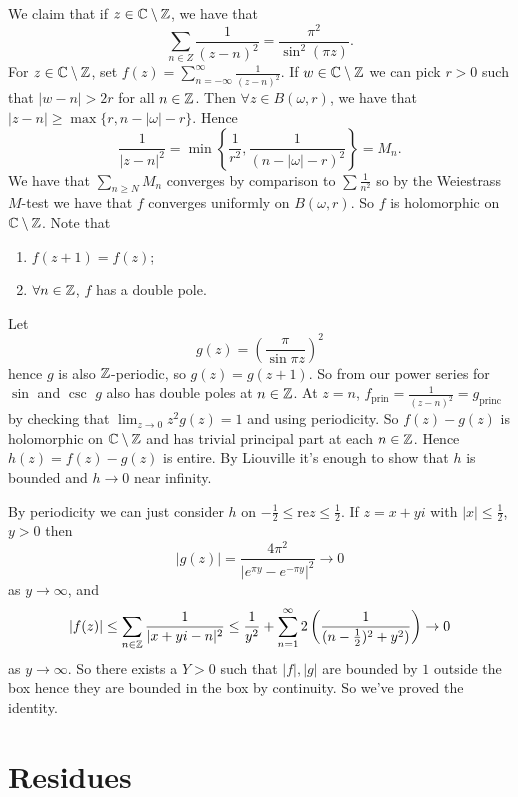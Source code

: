 \documentclass{article}
\begin{document}
\begin{example}
  We claim that if $ z\in \mathbb{C}\setminus \mathbb{Z} $, we have that
  \[
	  \sum_{n\in Z} \frac 1{(z-n)^2} = \frac {\pi^2}{\sin^2(\pi z)}.
  \]
  For $ z\in \mathbb{C}\setminus \mathbb{Z} $, set $ f(z) = \sum_{n=-\infty}^\infty \frac 1{(z-n)^2} $. If $ w\in \mathbb{C}\setminus \mathbb{Z} $ we can pick $ r>0 $ such that $ |w-n| > 2r $ for all $ n\in \mathbb{Z} $. Then $ \forall z\in B(\omega,r) $, we have that $ |z-n| \ge \max\{r,n-|\omega| -r \} $. Hence
  \[
	  \frac 1{|z-n|^2} = \min\left\{ \frac 1{r^2}, \frac1{(n-|\omega|-r)^2}\right\} = M_n.
  \]
  We have that $ \sum_{n\ge N} M_n $ converges by comparison to $ \sum \frac 1{n^2} $ so by the Weiestrass $ M $-test we have that $ f $ converges uniformly on $ B(\omega,r) $. So $ f $ is holomorphic on $ \mathbb{C}\setminus \mathbb{Z} $. Note that 
  \begin{enumerate}
	  \item $ f(z+1) = f(z) $;
	  \item $ \forall n\in \mathbb{Z} $, $ f $ has a double pole.
  \end{enumerate}
  Let
  \[
	  g(z) = \left(\frac \pi{\sin\pi z}\right)^2
  \]
  hence $ g $ is also $ \mathbb{Z} $-periodic, so $ g(z) = g(z+1) $. So from our power series for $ \sin $ and $ \csc $ $ g $ also has double poles at $ n\in \mathbb{Z} $. At $ z=n $, $ f_{\text{prin}} = \frac 1{(z-n)^2}=g_{\text{princ}} $ by checking that $ \lim_{z\to 0} z^2g(z) = 1 $ and using periodicity. So $ f(z)-g(z) $ is holomorphic on $ \mathbb{C}\setminus \mathbb{Z} $ and has trivial principal part at each $ n\in \mathbb{Z} $. Hence $ h(z) = f(z)-g(z) $ is entire. By Liouville it's enough to show that $ h $ is bounded and $ h\to 0 $ near infinity.\par
  By periodicity we can just consider $ h $ on $ -\frac 12 \le \mathrm{re} z \le \frac 12 $. If $ z=x+yi $ with $ |x| \le \frac 12 $, $ y>0 $ then
  \[
	  |g(z)| = \frac{4\pi^2}{|e^{\pi y}-e^{-\pi y}|^2} \to 0
  \]
  as $ y\to\infty $, and
  \[
	  |f(z)| \le \sum_{n\in \mathbb{Z}} \frac 1{|x+yi-n|^2} \le \frac 1{y^2} + \sum_{n=1}^\infty 2\left(\frac 1{(n-\frac 12)^2 +y^2)}\right)\to 0
  \]
  as $ y\to \infty $. So there exists a $ Y>0 $ such that $ |f|,|g| $ are bounded by $ 1 $ outside the box hence they are bounded in the box by continuity. So we've proved the identity.
\end{example}
\section{Residues}
\end{document}
